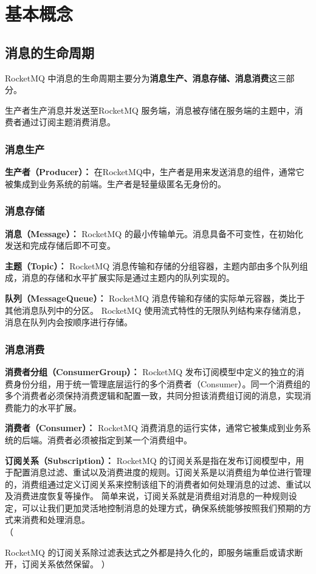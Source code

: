 \documentclass[11pt, a4paper, oneside, fontset=none]{ctexbook}
\newenvironment{ignore}{%
  \color{gray}%
  \ignorespaces%
  （%
}{%
  ）%
  \ignorespacesafterend%
}
\begin{document}
\section{基本概念}

\subsection{消息的生命周期}
RocketMQ 中消息的生命周期主要分为{\bfseries\kaishu 消息生产、消息存储、消息消费}这三部分。

生产者生产消息并发送至RocketMQ 服务端，消息被存储在服务端的主题中，消费者通过订阅主题消费消息。

\subsubsection{消息生产}
\textbf{生产者（Producer）：}
在RocketMQ中，生产者是用来发送消息的组件，通常它被集成到业务系统的前端。生产者是轻量级匿名无身份的。

\subsubsection{消息存储}
\textbf{消息（Message）：}
RocketMQ 的最小传输单元。消息具备不可变性，在初始化发送和完成存储后即不可变。

\textbf{主题（Topic）：}
RocketMQ 消息传输和存储的分组容器，主题内部由多个队列组成，消息的存储和水平扩展实际是通过主题内的队列实现的。

\textbf{队列（MessageQueue）：}
RocketMQ 消息传输和存储的实际单元容器，类比于其他消息队列中的分区。 RocketMQ 使用流式特性的无限队列结构来存储消息，消息在队列内会按顺序进行存储。

\subsubsection{消息消费}
\textbf{消费者分组（ConsumerGroup）：}
RocketMQ 发布订阅模型中定义的独立的消费身份分组，用于统一管理底层运行的多个消费者（Consumer）。同一个消费组的多个消费者必须保持消费逻辑和配置一致，共同分担该消费组订阅的消息，实现消费能力的水平扩展。

\textbf{消费者（Consumer）：}
RocketMQ 消费消息的运行实体，通常它被集成到业务系统的后端。消费者必须被指定到某一个消费组中。

\textbf{订阅关系（Subscription）：}
RocketMQ 的订阅关系是指在发布订阅模型中，用于配置消息过滤、重试以及消费进度的规则。订阅关系是以消费组为单位进行管理的，消费组通过定义订阅关系来控制该组下的消费者如何处理消息的过滤、重试以及消费进度恢复等操作。
简单来说，订阅关系就是消费组对消息的一种规则设定，可以让我们更加灵活地控制消息的处理方式，确保系统能够按照我们预期的方式来消费和处理消息。\\
\begin{ignore}
  RocketMQ 的订阅关系除过滤表达式之外都是持久化的，即服务端重启或请求断开，订阅关系依然保留。
\end{ignore}
\end{document}
